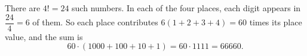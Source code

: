 There are $4!=24$ such numbers. In each of the four places, each digit appears in $\dfrac{24}{4}=6$ of them. So each place contributes $6(1+2+3+4)=60$ times its place value, and the sum is
\[
60\cdot(1000+100+10+1)=60\cdot1111=\boxed{66660}.
\]
